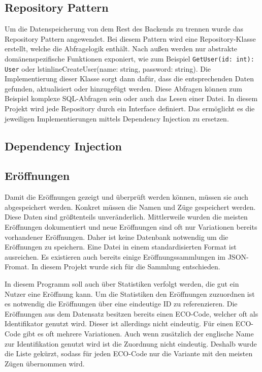 \subsection{Repository Pattern}
Um die Datenspeicherung von dem Rest des Backends zu trennen wurde das Repository Pattern angewendet. Bei diesem Pattern wird eine Repository-Klasse erstellt, welche die Abfragelogik enthält. Nach außen werden nur abstrakte domänenspezifische Funktionen exponiert, wie zum Beispiel \lstinline{GetUser(id: int): User} oder lstinline{CreateUser(name: string, password: string)}. Die Implementierung dieser Klasse sorgt dann dafür, dass die entsprechenden Daten gefunden, aktualisiert oder hinzugefügt werden. Diese Abfragen können zum Beispiel komplexe SQL-Abfragen sein oder auch das Lesen einer Datei. In diesem Projekt wird jede Repository durch ein Interface definiert. Das ermöglicht es die jeweiligen Implementierungen mittels Dependency Injection zu ersetzen. \cite{evans_domain-driven_2004}

\subsection{Dependency Injection}

\subsection{Eröffnungen}
Damit die Eröffnungen gezeigt und überprüft werden können, müssen sie auch abgespeichert werden. Konkret müssen die Namen und Züge gespeichert werden. Diese Daten sind größtenteils unveränderlich. Mittlerweile wurden die meisten Eröffnungen dokumentiert und neue Eröffnungen sind oft nur Variationen bereits vorhandener Eröffnungen. Daher ist keine Datenbank notwendig um die Eröffnungen zu speichern. Eine Datei in einem standardisierten Format ist ausreichen. Es existieren auch bereits einige Eröffnungssammlungen im JSON-Fromat. In diesem Projekt wurde sich für die Sammlung \cite{lichessorg_chess-openings_2025} entschieden.

In diesem Programm soll auch über Statistiken verfolgt werden, die gut ein Nutzer eine Eröffnung kann. Um die Statistiken den Eröffnungen zuzuordnen ist es notwendig die Eröffnungen über eine eindeutige ID zu referenzieren. Die Eröffnungen aus dem Datensatz besitzen bereits einen ECO-Code, welcher oft als Identifikator genutzt wird. Dieser ist allerdings nicht eindeutig. Für einen ECO-Code gibt es oft mehrere Variationen. Auch wenn zusätzlich der englische Name zur Identifikation genutzt wird ist die Zuordnung nicht eindeutig. Deshalb wurde die Liste gekürzt, sodass für jeden ECO-Code nur die Variante mit den meisten Zügen übernommen wird.

